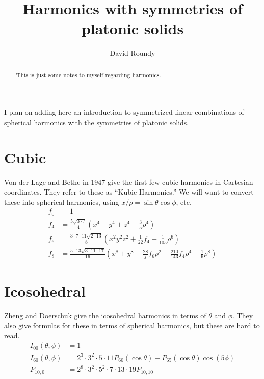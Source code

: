 \documentclass[letterpaper,twocolumn,amsmath,amssymb,pre]{revtex4-1}
\begin{document}
\title{Harmonics with symmetries of platonic solids}

\author{David Roundy}
\begin{abstract}
  This is just some notes to myself regarding harmonics.
\end{abstract}

\newcommand\rot{\ensuremath{\mathbf{\varpi}}}
\newcommand\rhat{\ensuremath{\mathbf{\hat{r}}}}
\newcommand\solidangle{\ensuremath{\Omega}}

\maketitle

I plan on adding here an introduction to symmetrized linear
combinations of spherical harmonics with the symmetries of platonic
solids.

\section{Cubic}

Von der Lage and Bethe in 1947 give the first few cubic harmonics in
Cartesian coordinates.  They refer to these as ``Kubic Harmonics.''
We will want to convert these into spherical harmonics, using $x/\rho
= \sin\theta\cos\phi$, etc.
\begin{align}
  f_0 &= 1 \\
  f_4 &= \frac{5\sqrt{3\cdot 7}}{4}\left(
  x^4 + y^4 + z^4 - \frac35 \rho^4
  \right) \\
  f_6 &= \frac{3\cdot 7 \cdot 11 \sqrt{2\cdot 13}}{8}\left(
  x^2y^2z^2 + \frac1{22} f_4 - \frac1{105}\rho^6
  \right)\\
  f_8 &= \frac{5\cdot 13  \sqrt{3\cdot 11 \cdot 17}}{16}\left(
  x^8 + y^8 - \frac{28}{f} f_6 \rho^2 - \frac{210}{143} f_4 \rho^4 - \frac16\rho^8
  \right)
\end{align}

\section{Icosohedral}

Zheng and Doerschuk give the icosohedral harmonics in terms of
$\theta$ and $\phi$.  They also give formulas for these in terms of
spherical harmonics, but these are hard to read.
\begin{align}
  I_{00}(\theta,\phi) &= 1 \\
  I_{60}(\theta,\phi) &= 2^3 \cdot 3^2 \cdot 5 \cdot 11
  P_{60}(\cos\theta) - P_{65}(\cos\theta)\cos(5\phi)
  \\
  P_{10,0} &= 2^8 \cdot 3^2 \cdot 5^2 \cdot 7 \cdot 13
  \cdot 19 P_{10,10}
\end{align}
\end{document}
